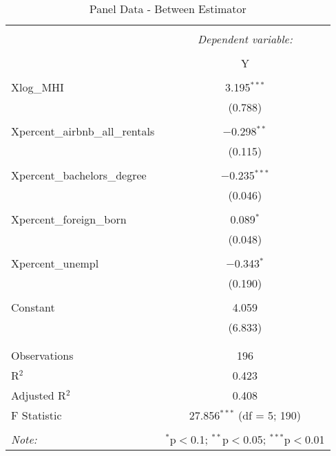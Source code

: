\documentclass{article}
\begin{document}
\begin{table}[!htbp] \centering 
  \caption{Panel Data - Between Estimator} 
  \label{} 
  \begin{tabular}{@{\extracolsep{5pt}}lc} 
    \\[-1.8ex]\hline 
    \hline \\[-1.8ex] 
    & \multicolumn{1}{c}{\textit{Dependent variable:}} \\ 
    \cline{2-2} 
    \\[-1.8ex] & Y \\ 
    \hline \\[-1.8ex] 
    Xlog\_MHI & 3.195$^{***}$ \\ 
    & (0.788) \\ 
    & \\ 
    Xpercent\_airbnb\_all\_rentals & $-$0.298$^{**}$ \\ 
    & (0.115) \\ 
    & \\ 
    Xpercent\_bachelors\_degree & $-$0.235$^{***}$ \\ 
    & (0.046) \\ 
    & \\ 
    Xpercent\_foreign\_born & 0.089$^{*}$ \\ 
    & (0.048) \\ 
    & \\ 
    Xpercent\_unempl & $-$0.343$^{*}$ \\ 
    & (0.190) \\ 
    & \\ 
    Constant & 4.059 \\ 
    & (6.833) \\ 
    & \\ 
    \hline \\[-1.8ex] 
    Observations & 196 \\ 
    R$^{2}$ & 0.423 \\ 
    Adjusted R$^{2}$ & 0.408 \\ 
    F Statistic & 27.856$^{***}$ (df = 5; 190) \\ 
    \hline 
    \hline \\[-1.8ex] 
    \textit{Note:}  & \multicolumn{1}{r}{$^{*}$p$<$0.1; $^{**}$p$<$0.05; $^{***}$p$<$0.01} \\ 
  \end{tabular} 
\end{table} 
\end{document}
